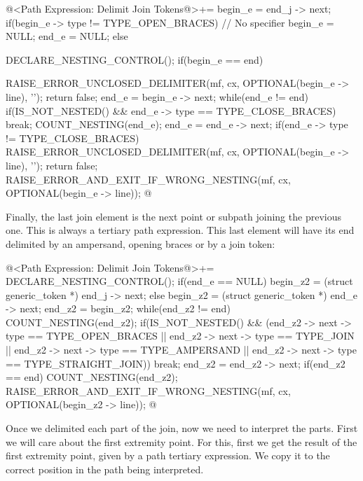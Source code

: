 {{\iniciocodigo
@<Path Expression: Delimit Join Tokens@>+=
begin_e = end_j -> next;
if(begin_e -> type != TYPE_OPEN_BRACES){ // No specifier
  begin_e = NULL;
  end_e = NULL;
} else{
  DECLARE_NESTING_CONTROL();
  if(begin_e == end){
    RAISE_ERROR_UNCLOSED_DELIMITER(mf, cx, OPTIONAL(begin_e -> line), '{');
    return false;
  }  
  end_e = begin_e -> next;
  while(end_e != end){
    if(IS_NOT_NESTED() && end_e -> type == TYPE_CLOSE_BRACES)
      break;
    COUNT_NESTING(end_e);
    end_e = end_e -> next;
  }
  if(end_e -> type != TYPE_CLOSE_BRACES){
    RAISE_ERROR_UNCLOSED_DELIMITER(mf, cx, OPTIONAL(begin_e -> line), '{');
    return false;
  }
  RAISE_ERROR_AND_EXIT_IF_WRONG_NESTING(mf, cx, OPTIONAL(begin_e -> line));
}
@
\fimcodigo

Finally, the last join element is the next point or subpath joining
the previous one. This is always a tertiary path expression. This last
element will have its end delimited by an ampersand, opening braces or
by a join token:

\iniciocodigo
@<Path Expression: Delimit Join Tokens@>+=
{
  DECLARE_NESTING_CONTROL();
  if(end_e == NULL)
    begin_z2 = (struct generic_token *) end_j -> next;
  else
    begin_z2 = (struct generic_token *) end_e -> next;
  end_z2 = begin_z2;
  while(end_z2 != end){
    COUNT_NESTING(end_z2);
    if(IS_NOT_NESTED() &&
       (end_z2 -> next -> type == TYPE_OPEN_BRACES ||
        end_z2 -> next -> type == TYPE_JOIN ||
        end_z2 -> next -> type == TYPE_AMPERSAND ||
        end_z2 -> next -> type == TYPE_STRAIGHT_JOIN))
      break;
    end_z2 = end_z2 -> next;
  }
  if(end_z2 == end)
    COUNT_NESTING(end_z2);
  RAISE_ERROR_AND_EXIT_IF_WRONG_NESTING(mf, cx, OPTIONAL(begin_z2 -> line));
}
@
\fimcodigo

Once we delimited each part of the join, now we need to interpret the
parts. First we will care about the first extremity point. For this,
first we get the result of the first extremity point, given by a path
tertiary expression. We copy it to the correct position in the path
being interpreted.

}}}}
